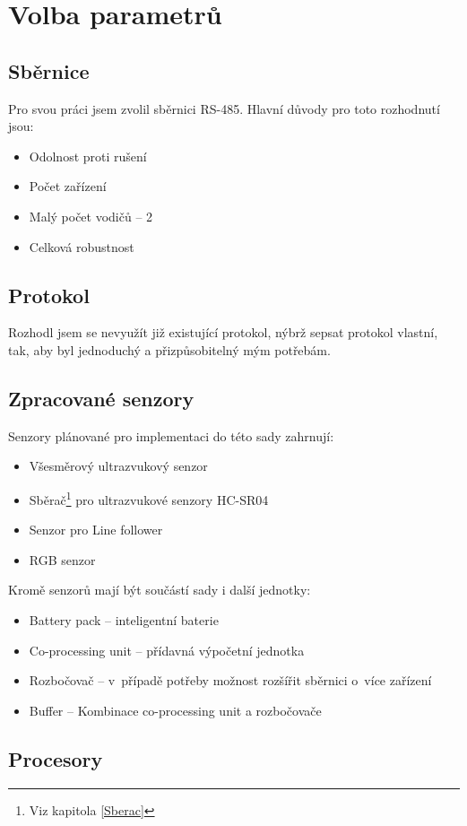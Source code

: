 \chapter{Volba parametrů}
\section{Sběrnice}
Pro svou práci jsem zvolil sběrnici RS-485.
Hlavní důvody pro toto rozhodnutí jsou:
\begin{itemize}
    \item Odolnost proti rušení
    \item Počet zařízení
    \item Malý počet vodičů -- 2
    \item Celková robustnost
\end{itemize}

\section{Protokol}
Rozhodl jsem se nevyužít již existující protokol, nýbrž sepsat protokol vlastní, tak, aby byl jednoduchý a přizpůsobitelný mým potřebám. 
\section{Zpracované senzory}
Senzory plánované pro implementaci do této sady zahrnují:
\begin{itemize}
    \item Všesměrový ultrazvukový senzor
    \item Sběrač\footnote{Viz kapitola \ref{Sberac}} pro ultrazvukové senzory HC-SR04 
    \item Senzor pro Line follower
    \item RGB senzor
    
\end{itemize}
Kromě senzorů mají být součástí sady i další jednotky:
\begin{itemize}
    \item Battery pack -- inteligentní baterie
    \item Co-processing unit -- přídavná výpočetní jednotka
    \item Rozbočovač -- v~případě potřeby možnost rozšířit sběrnici o~více zařízení
    \item Buffer -- Kombinace co-processing unit a rozbočovače
\end{itemize}
\section{Procesory}

